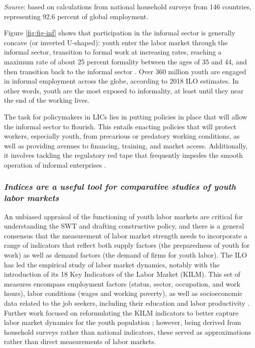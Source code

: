 \documentclass[
  a4paper, twoside, 12pt]{book}
\begin{document}
\footnotesize

\noindent \emph{Source}: \textcite{ilo2023a} based on calculations from national household surveys from 146 countries, representing 92.6 percent of global employment.
\normalsize
\hfill\break

Figure \ref{fig:fig-inf} shows that participation in the informal sector is generally concave (or inverted U-shaped): youth enter the labor market through the informal sector, transition to formal work at increasing rates, reaching a maximum rate of about 25 percent formality between the ages of 35 and 44, and then transition back to the informal sector \autocite{chacaltana2019}. Over 360 million youth are engaged in informal employment across the globe, according to 2018 ILO estimates. In other words, youth are the most exposed to informality, at least until they near the end of the working lives.

The task for policymakers in LICs lies in putting policies in place that will allow the informal sector to flourish. This entails enacting policies that will protect workers, especially youth, from precarious or predatory working conditions, as well as providing avenues to financing, training, and market access. Additionally, it involves tackling the regulatory red tape that frequently impedes the smooth operation of informal enterprises \autocite{imf2017}.

\hypertarget{indices-are-a-useful-tool-for-comparative-studies-of-youth-labor-markets}{%
\subsubsection*{\texorpdfstring{\emph{Indices are a useful tool for comparative studies of youth labor markets}}{Indices are a useful tool for comparative studies of youth labor markets}}\label{indices-are-a-useful-tool-for-comparative-studies-of-youth-labor-markets}}

An unbiased appraisal of the functioning of youth labor markets are critical for understanding the SWT and drafting constructive policy, and there is a general consensus that the measurement of labor market strength needs to incorporate a range of indicators that reflect both supply factors (the preparedness of youth for work) as well as demand factors (the demand of firms for youth labor). The ILO has led the empirical study of labor market dynamics, notably with the introduction of its 18 Key Indicators of the Labor Market (KILM). This set of measures encompass employment factors (status, sector, occupation, and work hours), labor conditions (wages and working poverty), as well as socioeconomic data related to the job seekers, including their education and labor productivity \autocite{ilo2016}. Further work focused on reformulating the KILM indicators to better capture labor market dynamics for the youth population \autocite{elder2010}; however, being derived from household surveys rather than national indicators, these served as approximations rather than direct measurements of labor markets.
\end{document}
